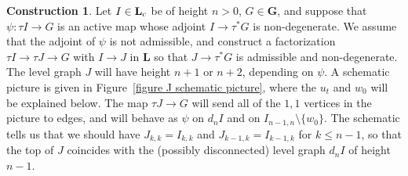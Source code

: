 \documentclass{amsart}
\numberwithin{theorem}{subsection}
\theoremstyle{definition}
\newtheorem{construction}[theorem]{Construction}
\newcommand{\name}[1]{\ensuremath{\text{\textup{#1}}}}
\newcommand{\levelg}{\mathbf{L}}
\newcommand{\levelgconn}{\levelg_{\name{c}}}
\newcommand{\bbY}{\mathbf{G}}
\begin{document}
\begin{construction}\label{construction: factorization through admissible}
Let $I \in \levelgconn$ be of height $n > 0$, $G \in \bbY$, and suppose that $\psi \colon  \tau I \to G$ is an active map whose adjoint $I \to \tau^*G$ is non-degenerate.
We assume that the adjoint of $\psi$ is not admissible, and construct a factorization $\tau I \to \tau J \to G$ with $I\to J$ in $\levelg$ so that $J \to \tau^*G$ is admissible and non-degenerate.
The level graph $J$ will have height $n+1$ or $n+2$, depending on $\psi$.
A schematic picture is given in Figure~\ref{figure J schematic picture}, where the $u_t$ and $w_0$ will be explained below.
The map $\tau J \to G$ will send all of the $1,1$ vertices in the picture to edges, and will behave as $\psi$ on $d_nI$ and on $I_{n-1,n} \setminus \{w_0\}$.
The schematic tells us that we should have $J_{k,k} = I_{k,k}$ and $J_{k-1,k} = I_{k-1,k}$ for $k \leq n-1$, so that the top of $J$ coincides with the (possibly disconnected) level graph $d_nI$ of height $n-1$.


\end{construction}
\end{document}
